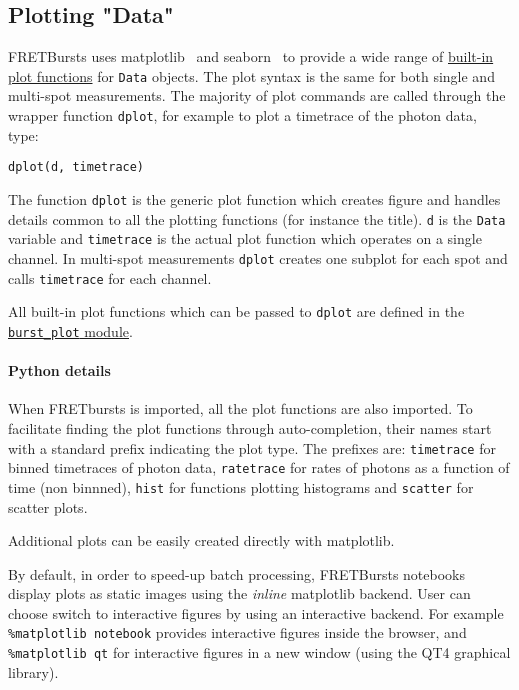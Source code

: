 \subsection{Plotting "Data"}
\label{sec:plotting}

FRETBursts uses 
matplotlib~\cite{2096e2a4-8f50-4519-bfb3-f796da201630}
and seaborn~\cite{7d9c2aad-1e9a-4098-bec5-38ab80b85d7e} 
to provide a wide range of
\href{http://fretbursts.readthedocs.org/en/latest/plots.html}{built-in plot functions}
for \verb|Data| objects.
The plot syntax is the same for both single and multi-spot measurements.
The majority of plot commands are called through the wrapper function
\verb|dplot|, for example to plot a timetrace of the photon data, type:

\begin{verbatim}
dplot(d, timetrace)
\end{verbatim}

The function \verb|dplot| is the generic plot function which creates figure
and handles details common to all the plotting functions (for instance the title).
\verb|d| is the \verb|Data| variable and \verb|timetrace| is the actual plot
function which operates on a single channel. In multi-spot measurements
\verb|dplot| creates one subplot for each spot and calls \verb|timetrace| for
each channel.

All built-in plot functions which can be passed to
\verb|dplot| are defined in the
\href{http://fretbursts.readthedocs.org/en/latest/plots.html}{\texttt{burst\_plot} module}.

\paragraph{Python details}

When FRETbursts is imported, all the plot functions are also imported.
To facilitate finding the plot functions through auto-completion,
their names start with a standard prefix indicating the
plot type. The prefixes are: \verb|timetrace| for binned timetraces
of photon data, \verb|ratetrace| for rates of photons as a function of time (non
binnned), \verb|hist| for functions plotting histograms and \verb|scatter| for
scatter plots.

Additional plots can be easily created directly with matplotlib.

By default, in order to speed-up batch processing, FRETBursts notebooks display plots 
as static images using the \textit{inline} matplotlib backend. 
User can choose switch to interactive figures by using an interactive backend. 
For example \verb|%matplotlib notebook| 
provides interactive figures inside the browser, 
and \verb|%matplotlib qt| 
for interactive figures in a new window (using the QT4 graphical library).

